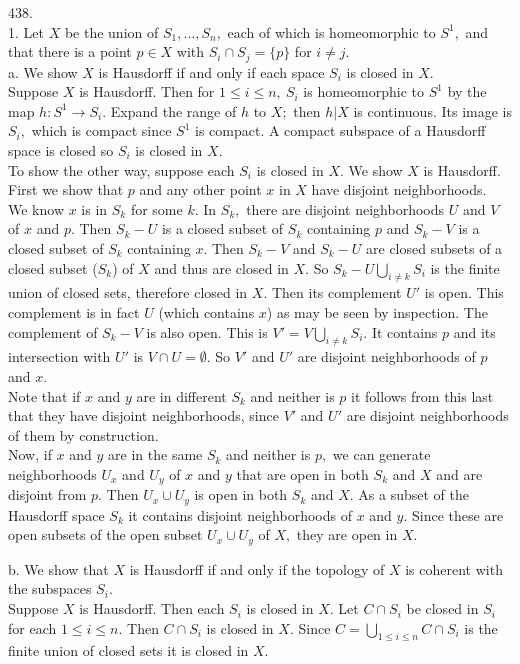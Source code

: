\documentclass{article}
\begin{document}
438.
\\1. Let $X$ be the union of $S_1,\ldots, S_n,$ each of which is homeomorphic to $S^1,$ and that there is a point $p\in X$ with $S_i\cap S_j=\{p\}$ for $i\ne j.$
\\a. We show $X$ is Hausdorff if and only if each space $S_i$ is closed in $X.$
\\Suppose $X$ is Hausdorff.  Then for $1\le i\le n,\ S_i$ is homeomorphic to $S^1$ by the map $h:S^1\to S_i.$  Expand the range of $h$ to $X;$ then $h|X$ is continuous.  Its image is $S_i,$ which is compact since $S^1$ is compact.  A compact subspace of a Hausdorff space is closed so $S_i$ is closed in $X.$
\\To show the other way, suppose each $S_i$ is closed in $X.$  We show $X$ is Hausdorff.
\\
First we show that $p$ and any other point $x$ in $X$ have disjoint neighborhoods.
\\
We know $x$ is in $S_k$ for some $k.$  In $S_k,$ there are disjoint neighborhoods $U$ and $V$ of $x$ and $p.$  Then $S_k-U$ is a closed subset of $S_k$ containing $p$ and $S_k-V$ is a closed subset of $S_k$ containing $x.$  Then $S_k-V$ and $S_k-U$ are closed subsets of a closed subset ($S_k$) of $X$ and thus are closed in $X.$  So $S_k-U\bigcup_{i\ne k}S_i$ is the finite union of closed sets, therefore closed in $X.$  Then its complement $U'$ is open.  This complement is in fact $U$ (which contains $x$) as may be seen by inspection.
The complement of $S_k-V$ is also open.  This is $V'=V\bigcup_{i\ne k}S_i.$  It contains $p$ and its intersection with $U'$ is $V\cap U=\emptyset.$  So $V'$ and $U'$ are disjoint neighborhoods of $p$ and $x.$
\\
Note that if $x$ and $y$ are in different $S_k$ and neither is $p$ it follows from this last that they have disjoint neighborhoods, since $V'$ and $U'$ are disjoint neighborhoods of them by construction.
\\
Now, if $x$ and $y$ are in the same $S_k$ and neither is $p,$ we can generate neighborhoods $U_x$ and $U_y$ of $x$ and $y$ that are open in both $S_k$ and $X$ and are disjoint from $p.$  Then $U_x\cup U_y$ is open in both $S_k$ and $X.$  As a subset of the Hausdorff space $S_k$ it contains disjoint neighborhoods of $x$ and $y.$  Since these are open subsets of the open subset $U_x\cup U_y$ of $X,$ they are open in $X.$

b. We show that $X$ is Hausdorff if and only if the topology of $X$ is coherent with the subspaces $S_i.$
\\
Suppose $X$ is Hausdorff.  Then each $S_i$ is closed in $X.$  Let $C\cap S_i$ be closed in $S_i$ for each $1\le i\le n.$  Then $C\cap S_i$ is closed in $X.$  Since $C=\bigcup_{1\le i\le n}C\cap S_i$ is the finite union of closed sets it is closed in $X.$
\end{document}
